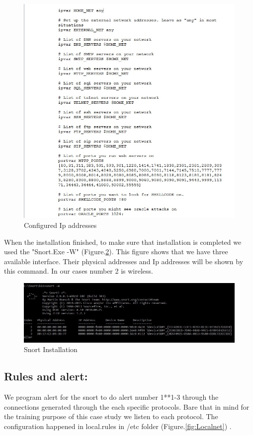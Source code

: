 \documentclass{article}
\begin{document}
\begin{figure}[H]
	\begin{center}
		\includegraphics[width=0.6
		\textwidth]{Ipconf.jpg}
	\end{center}
	\caption{Configured Ip addresses}
	\label{fig:Ipconf}
\end{figure}

When the installation finished, to make sure that installation is completed we used the "Snort.Exe -W" (Figure.\ref{fig:SnortIns}). This figure shows that we have three available interface. Their physical addresses and Ip addresses  will be shown by this command. In our cases number 2 is  wireless.


\begin{figure}[H]
	\begin{center}
		\includegraphics[width=0.6
\textwidth]{SnortIns.jpg}
	\end{center}
	\caption{Snort Installation}
	\label{fig:SnortIns}
\end{figure}





\subsection{Rules and alert:}

We program alert for the snort to do alert number 1**1-3 through the connections generated through the each specific protocols. Bare that in mind for the training purpose of this case study we listen to each protocol. The configuration happened in local.rules in /etc folder (Figure.\ref{fig:Localnet}) .
\end{document}
